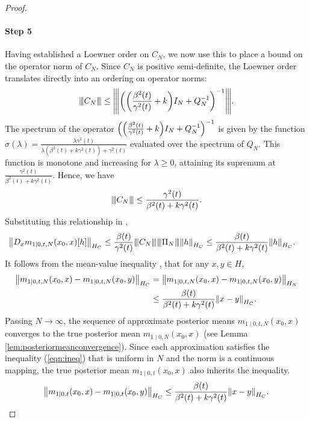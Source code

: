 \begin{proof}
  \paragraph{Step 5} Having established a Loewner order on \(C_{N}\), we now use this to place a bound on the operator norm of \(C_{N}\). Since \(C_{N}\) is positive semi-definite, the Loewner order translates directly into an ordering on operator norms:
  \[
    {\left\vert\kern-0.25ex\left\vert\kern-0.25ex\left\vert C_{N} \right\vert\kern-0.25ex\right\vert\kern-0.25ex\right\vert} \leq {\left\vert\kern-0.25ex\left\vert\kern-0.25ex\left\vert \qty(\qty(\frac{\beta^{2}(t)}{\gamma^{2}(t)} + k) I_{N} + Q_{N}^{-1})^{-1} \right\vert\kern-0.25ex\right\vert\kern-0.25ex\right\vert}.
  \] %
  The spectrum of the operator \(\qty(\qty(\frac{\beta^{2}(t)}{\gamma^{2}(t)} + k) I_{N} + Q_{N}^{-1})^{-1}\) is given by the function \(\sigma(\lambda) = \frac{\lambda \gamma^{2}(t)}{\lambda (\beta^{2}(t) + k \gamma^{2}(t)) + \gamma^{2}(t)}\) evaluated over the spectrum of \(Q_{N}\). This function is monotone and increasing for \(\lambda \geq 0\), attaining its supremum at \(\frac{\gamma^{2}(t)}{\beta^{2}(t) + k \gamma^{2}(t)}\). Hence, we have
  \[
    {\left\vert\kern-0.25ex\left\vert\kern-0.25ex\left\vert C_{N} \right\vert\kern-0.25ex\right\vert\kern-0.25ex\right\vert} \leq \frac{\gamma^{2}(t)}{\beta^{2}(t) + k \gamma^{2}(t)}.
  \] Substituting this relationship in ,
  \begin{align*}
    \norm{D_{x} m_{1 \mid 0, t, N}(x_{0}, x)[h]}_{H_{C}} &\leq \frac{\beta(t)}{\gamma^{2}(t)} {\left\vert\kern-0.25ex\left\vert\kern-0.25ex\left\vert C_{N} \right\vert\kern-0.25ex\right\vert\kern-0.25ex\right\vert} {\left\vert\kern-0.25ex\left\vert\kern-0.25ex\left\vert \Pi_{N} \right\vert\kern-0.25ex\right\vert\kern-0.25ex\right\vert} \norm{h}_{H_{C}} \leq \frac{\beta(t)}{\beta^{2}(t) + k \gamma^{2}(t)} \norm{h}_{H_{C}}.
  \end{align*}
  It follows from the mean-value inequality \citep[][Theorem 2.1.19]{berger1977nonlinearity}, that for any \(x, y \in H\),
  \begin{align}
    \norm{m_{1 \mid 0, t, N}(x_{0}, x) - m_{1 \mid 0, t, N}(x_{0}, y)}_{H_{C}} &= \norm{m_{1 \mid 0, t, N}(x_{0}, x) - m_{1 \mid 0, t, N}(x_{0}, y)}_{H_{N}} \notag \\
    &\leq \frac{\beta(t)}{\beta^{2}(t) + k \gamma^{2}(t)} \norm{x - y}_{H_{C}}. \label{eqn:ineq}
  \end{align}%
  Passing \(N \to \infty\), the sequence of approximate posterior means \(m_{1 \mid 0, t, N}(x_{0}, x)\) converges to the true posterior mean \(m_{1 \mid 0, N}(x_{0}, x)\) (see Lemma \ref{lem:posteriormeanconvergence}). Since each approximation satisfies the inequality (\ref{eqn:ineq}) that is uniform in \(N\) and the norm is a continuous mapping, the true posterior mean \(m_{1 \mid 0, t}(x_{0}, x)\) also inherits the inequality.
  \[
    \norm{m_{1 \mid 0, t}(x_{0}, x) - m_{1 \mid 0, t}(x_{0}, y)}_{H_{C}} \leq \frac{\beta(t)}{\beta^{2}(t) + k \gamma^{2}(t)} \norm{x - y}_{H_{C}}.
  \]


\end{proof}
